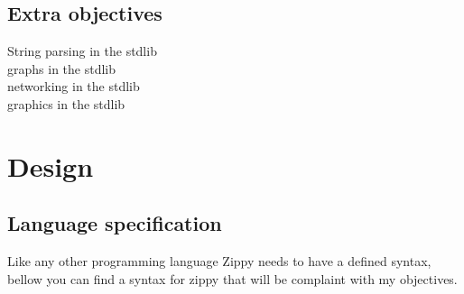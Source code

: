 \documentclass[a4paper,12pt]{article}
\begin{document}
\subsection{Extra objectives}
\begin{description}
	\item[String parsing in the stdlib]
	\item[graphs in the stdlib]
	\item[networking in the stdlib]
	\item[graphics in the stdlib]
\end{description}

\section{Design}
\subsection{Language specification}
Like any other programming language Zippy needs to have a defined syntax, bellow
you can find a syntax for zippy that will be complaint with my objectives.
\end{document}
